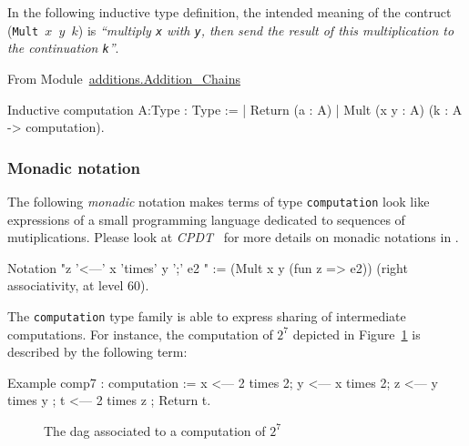   In the following inductive type definition, the intended meaning 
  of the contruct (\texttt{Mult $x$ $y$ $k$})  is \emph{``multiply \texttt{x} with 
\texttt{y}, then send  the result of this multiplication to 
  the continuation  \texttt{k}''}.



From Module~\href{../theories/html/additions.Addition_Chains.html}{additions.Addition\_Chains}

\begin{Coqsrc}
Inductive computation {A:Type}  : Type :=
| Return (a : A)
| Mult (x y : A) (k : A -> computation).    
\end{Coqsrc}
\subsubsection{Monadic notation}


The following \emph{monadic} 
notation makes terms of type \texttt{computation} look like
expressions of a small programming language dedicated to sequences of mutiplications.
Please look at \emph{CPDT}~\cite{chlipalacpdt2011} for more details on monadic notations in \coq.
\label{monadic-mult}

\begin{Coqsrc}
Notation "z '<---'  x 'times' y ';' e2 " :=
  (Mult x y  (fun z => e2))
    (right associativity, at level 60).
\end{Coqsrc}

The \texttt{computation} type family is able to express sharing of intermediate computations. For instance, the computation of $2^7$ depicted in Figure~\ref{fig:dag7} is described by  the following term:

\begin{Coqsrc}
Example comp7 : computation  :=
  x <--- 2 times 2;
  y <--- x times 2;
  z <--- y times y ;
  t <--- 2 times z ;
  Return t.  
\end{Coqsrc}

\begin{figure}[h]
  \centering
  \caption{The dag associated to a computation of $2^7$}
  \label{fig:dag7}
\end{figure}

